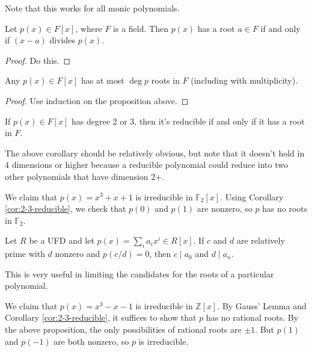 \documentclass[10pt]{report}
\begin{document}
Note that this works for all monic polynomials.

\begin{prop}
	Let $p(x) \in F[x]$, where $F$ is a field. Then $p(x)$ has a root $a \in F$ if and only if $(x-a)$ divides $p(x)$.
\end{prop}
\begin{proof}
	{\color{red}Do this.}
\end{proof}

\begin{cor}
	Any $p(x) \in F[x]$ has at most $\deg p$ roots in $F$ (including with multiplicity).
\end{cor}
\begin{proof}
	Use induction on the proposition above.
\end{proof}

\begin{cor}
	\label{cor:2-3-reducible}
	If $p(x) \in F[x]$ has degree 2 or 3, then it's reducible if and only if it has a root in $F$.
\end{cor}

The above corollary should be relatively obvious, but note that it doesn't hold in 4 dimensions or higher because a reducible polynomial could reduce into two other polynomials that have dimension 2+.

\begin{ex}[]
	We claim that $p(x) = x^3+x+1$ is irreducible in $\mathbb{F}_{2}[x]$. Using Corollary \ref{cor:2-3-reducible}, we check that $p(0)$ and $p(1)$ are nonzero, so $p$ has no roots in $\mathbb{F}_{2}$.
\end{ex}

\begin{prop}
	Let $R$ be a UFD and let $p(x) = \sum_i a_i x^i \in R[x]$. If $c$ and $d$ are relatively prime with $d$ nonzero and $p(c/d) = 0$, then $c \;|\; a_0$ and $d \;|\; a_n$.
\end{prop}

This is very useful in limiting the candidates for the roots of a particular polynomial.

\begin{ex}[]
	We claim that $p(x) = x^3-x-1$ is irreducible in $\mathbb{Z}[x]$. By Gauss' Lemma and Corollary \ref{cor:2-3-reducible}, it suffices to show that $p$ has no rational roots. By the above proposition, the only possibilities of rational roots are $\pm 1$. But $p(1)$ and $p(-1)$ are both nonzero, so $p$ is irreducible.
\end{ex}
\end{document}
